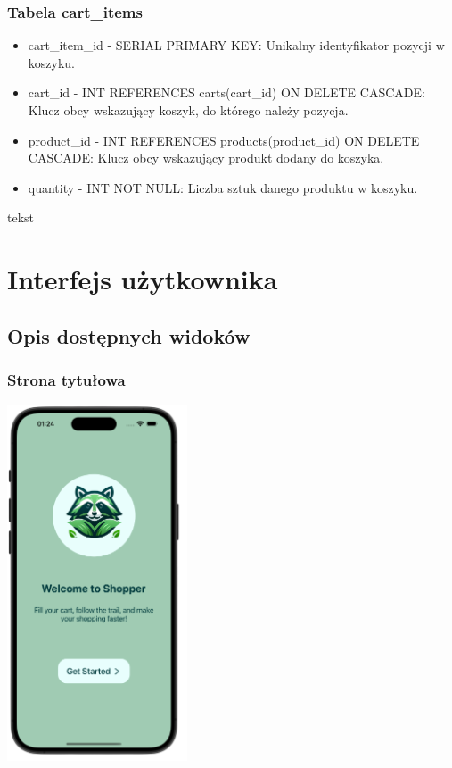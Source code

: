 \subsubsection{Tabela cart\_items}
\begin{itemize}
\item cart\_item\_id - SERIAL PRIMARY KEY: Unikalny identyfikator pozycji w koszyku.
\item cart\_id - INT REFERENCES carts(cart\_id) ON DELETE CASCADE: Klucz obcy wskazujący koszyk, do którego należy pozycja.
\item product\_id - INT REFERENCES products(product\_id) ON DELETE CASCADE: Klucz obcy wskazujący produkt dodany do koszyka.
\item quantity - INT NOT NULL: Liczba sztuk danego produktu w koszyku.
\end{itemize}

tekst

\section{Interfejs użytkownika}

\subsection{Opis dostępnych widoków}

\subsubsection{Strona tytułowa}

\begin{center}
\includegraphics[width=0.4\textwidth]{images/front/home_page.png}
\end{center}

